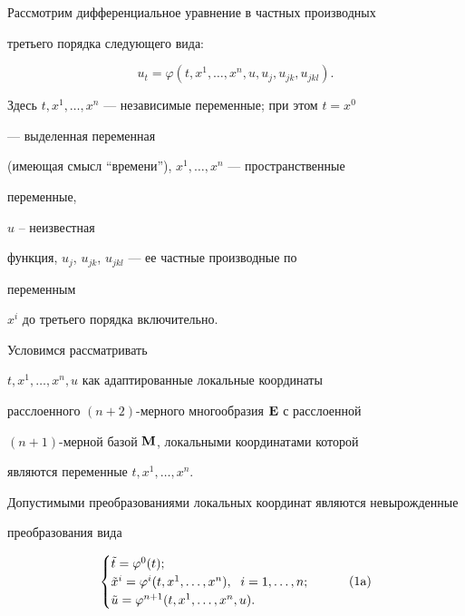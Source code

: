  


Рассмотрим дифференциальное уравнение в частных производных  


третьего порядка следующего вида: 


\begin{equation} 


u_t=\varphi(t,x^1,\dotsc,x^n,u,u_j,u_{jk},u_{jkl}).\tag{$*$} 


\end{equation} 


Здесь $t,x^1,\dotsc,x^n$ --- независимые переменные; при этом $t=x^0$ 


--- выделенная переменная 


(имеющая смысл ``времени''), $x^1,\dotsc,x^n$ --- пространственные 


переменные, 


$u$ -- неизвестная 


функция, $u_j$, $u_{jk}$, $u_{jkl}$ --- ее частные производные по 


переменным 


$x^i$ до третьего порядка включительно. 


Условимся рассматривать 


$t,x^1,\dotsc,x^n,u$ как адаптированные локальные координаты 


расслоенного $(n+2)$-мерного многообразия $\bold E$ с расслоенной 


$(n+1)$-мерной базой $\bold M$, локальными координатами которой 


являются переменные $t,x^1,\dotsc,x^n$. 


Допустимыми преобразованиями локальных координат являются невырожденные  


преобразования вида 


\begin{equation} 


\begin{cases} 


\Tilde t=\varphi^0(t);\\ 


\Tilde x^i=\varphi^i(t,x^1,\dotsc,x^n),\ \;i=1,\dotsc,n;\\ 


\Tilde u=\varphi^{n+1}(t,x^1,\dotsc,x^n,u). 


\end{cases} 


\tag{1\text{a}} 


\end{equation} 


